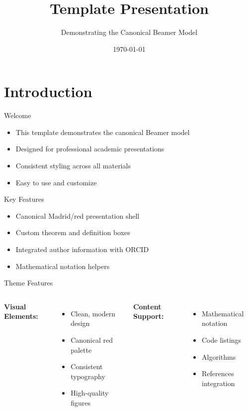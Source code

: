 \documentclass[aspectratio=169]{beamer}
\title{Template Presentation}
\subtitle{Demonstrating the Canonical Beamer Model}
\date{\today}
\begin{document}
\begin{frame}
  \titlepage
\end{frame}

\tocslide

\section{Introduction}

\begin{frame}{Welcome}
  \begin{itemize}
    \item This template demonstrates the canonical Beamer model
    \item Designed for professional academic presentations
    \item Consistent styling across all materials
    \item Easy to use and customize
  \end{itemize}

  \vspace{1em}

  \begin{block}{Key Features}
    \begin{itemize}
      \item Canonical Madrid/red presentation shell
      \item Custom theorem and definition boxes
      \item Integrated author information with ORCID
      \item Mathematical notation helpers
    \end{itemize}
  \end{block}
\end{frame}

\begin{frame}{Theme Features}
  \begin{columns}
    \textbf{Visual Elements:}
    \begin{itemize}
      \item Clean, modern design
      \item Canonical red palette
      \item Consistent typography
      \item High-quality figures
    \end{itemize}

    \textbf{Content Support:}
    \begin{itemize}
      \item Mathematical notation
      \item Code listings
      \item Algorithms
      \item References integration
    \end{itemize}
  \end{columns}
\end{frame}
\end{document}
